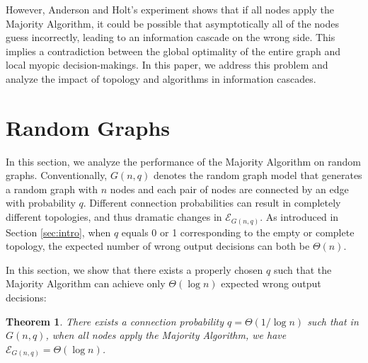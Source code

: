 \documentclass[a4paper,UKenglish]{lipics}
\newtheorem{thm}{Theorem}[section] %
\theoremstyle{definition}
\begin{document}
However, Anderson and Holt's experiment shows that if all nodes apply the Majority Algorithm, 
	it could be possible that asymptotically all of the nodes guess incorrectly, 
	leading to an information cascade on the wrong side. 
This implies a contradiction between the global optimality of the entire graph and local myopic decision-makings.
In this paper, we address this problem and analyze the impact of topology and algorithms in information cascades.









\section{Random Graphs}
In this section, we analyze the performance of the Majority Algorithm on random graphs.
Conventionally, $G(n, q)$ denotes the random graph model that generates a random graph with $n$ nodes and each pair of nodes are connected by an edge with probability $q$.
Different connection probabilities can result in completely different topologies, and thus dramatic changes in $\mathcal{E}_{G(n,q)}$.
As introduced in Section \ref{sec:intro}, when $q$ equals 0 or 1 corresponding to the empty or complete topology, the expected number of wrong output decisions can both be $\Theta(n)$.

In this section, we show that there exists a properly chosen $q$ such that the Majority Algorithm can achieve only $\Theta(\log n)$ expected wrong output decisions:

\begin{thm}
\label{thm:random graph log n reachable}
There exists a connection probability $q = \Theta(1/\log n)$ such that in $G(n, q)$, when all nodes apply the Majority Algorithm, we have $\mathcal{E}_{G(n,q)} = \Theta(\log n)$.
\end{thm}

	
\end{document}
